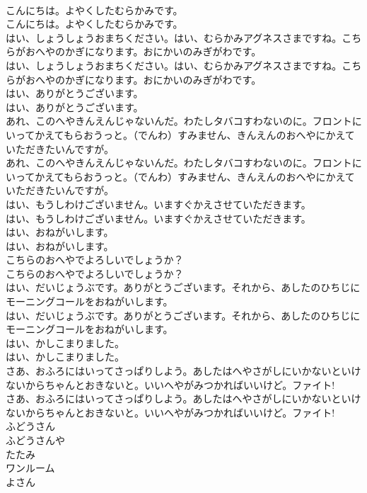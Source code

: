 \documentclass[8pt]{extreport}
\begin{document}
\begin{CJK}{UTF8}{min}
\\	こんにちは。よやくしたむらかみです。
\\	こんにちは。よやくしたむらかみです。
\\	はい、しょうしょうおまちください。はい、むらかみアグネスさまですね。こちらがおへやのかぎになります。おにかいのみぎがわです。
\\	はい、しょうしょうおまちください。はい、むらかみアグネスさまですね。こちらがおへやのかぎになります。おにかいのみぎがわです。
\\	はい、ありがとうございます。
\\	はい、ありがとうございます。
\\	あれ、このへやきんえんじゃないんだ。わたしタバコすわないのに。フロントにいってかえてもらおうっと。（でんわ）すみません、きんえんのおへやにかえていただきたいんですが。
\\	あれ、このへやきんえんじゃないんだ。わたしタバコすわないのに。フロントにいってかえてもらおうっと。（でんわ）すみません、きんえんのおへやにかえていただきたいんですが。
\\	はい、もうしわけございません。いますぐかえさせていただきます。
\\	はい、もうしわけございません。いますぐかえさせていただきます。
\\	はい、おねがいします。
\\	はい、おねがいします。
\\	こちらのおへやでよろしいでしょうか？
\\	こちらのおへやでよろしいでしょうか？
\\	はい、だいじょうぶです。ありがとうございます。それから、あしたのひちじにモーニングコールをおねがいします。
\\	はい、だいじょうぶです。ありがとうございます。それから、あしたのひちじにモーニングコールをおねがいします。
\\	はい、かしこまりました。
\\	はい、かしこまりました。
\\	さあ、おふろにはいってさっぱりしよう。あしたはへやさがしにいかないといけないからちゃんとおきないと。いいへやがみつかればいいけど。ファイト!
\\	さあ、おふろにはいってさっぱりしよう。あしたはへやさがしにいかないといけないからちゃんとおきないと。いいへやがみつかればいいけど。ファイト!
\\	ふどうさん
\\	ふどうさんや
\\	たたみ
\\	ワンルーム
\\	よさん

\end{CJK}
\end{document}
